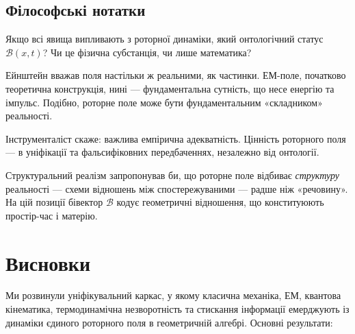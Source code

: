 \documentclass[11pt,a4paper]{article}
\newcommand{\Biv}{\mathcal{B}}
\theoremstyle{definition}
\theoremstyle{plain}
\theoremstyle{remark}
\begin{document}
\subsection{Філософські нотатки}

Якщо всі явища випливають з роторної динаміки, який онтологічний статус $\Biv(x,t)$? Чи це фізична субстанція, чи лише математика?

Ейнштейн вважав поля настільки ж реальними, як частинки. ЕМ-поле, початково теоретична конструкція, нині — фундаментальна сутність, що несе енергію та імпульс. Подібно, роторне поле може бути фундаментальним «складником» реальності.

Інструменталіст скаже: важлива емпірична адекватність. Цінність роторного поля — в уніфікації та фальсифіковних передбаченнях, незалежно від онтології.

Структуральний реалізм запропонував би, що роторне поле відбиває \emph{структуру} реальності — схеми відношень між спостережуваними — радше ніж «речовину». На цій позиції бівектор $\Biv$ кодує геометричні відношення, що конституюють простір-час і матерію.

\vspace{1em}

\section{Висновки}\label{sec:conclusion}

Ми розвинули уніфікувальний каркас, у якому класична механіка, ЕМ, квантова кінематика, термодинамічна незворотність та стискання інформації емерджують із динаміки єдиного роторного поля в геометричній алгебрі. Основні результати:
\end{document}
